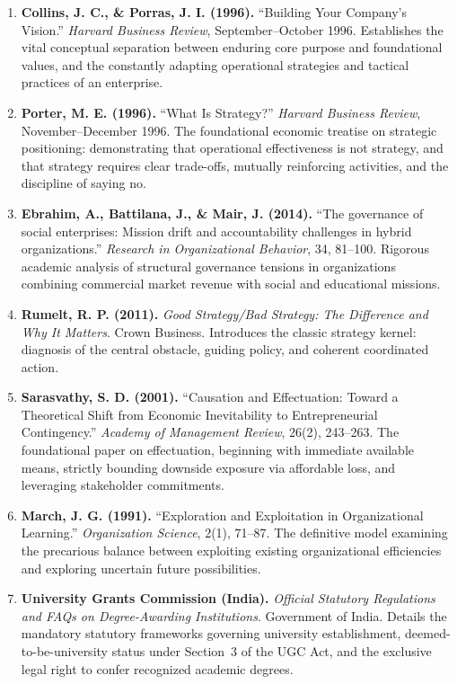 \begin{enumerate}[leftmargin=12pt,itemsep=3pt,topsep=1pt,parsep=0pt]
  \item \textbf{Collins, J. C., \& Porras, J. I. (1996).} ``Building Your Company's Vision.'' \textit{Harvard Business Review}, September--October 1996. Establishes the vital conceptual separation between enduring core purpose and foundational values, and the constantly adapting operational strategies and tactical practices of an enterprise.
  \item \textbf{Porter, M. E. (1996).} ``What Is Strategy?'' \textit{Harvard Business Review}, November--December 1996. The foundational economic treatise on strategic positioning: demonstrating that operational effectiveness is not strategy, and that strategy requires clear trade-offs, mutually reinforcing activities, and the discipline of saying no.
  \item \textbf{Ebrahim, A., Battilana, J., \& Mair, J. (2014).} ``The governance of social enterprises: Mission drift and accountability challenges in hybrid organizations.'' \textit{Research in Organizational Behavior}, 34, 81--100. Rigorous academic analysis of structural governance tensions in organizations combining commercial market revenue with social and educational missions.
  \item \textbf{Rumelt, R. P. (2011).} \textit{Good Strategy/Bad Strategy: The Difference and Why It Matters}. Crown Business. Introduces the classic strategy kernel: diagnosis of the central obstacle, guiding policy, and coherent coordinated action.
  \item \textbf{Sarasvathy, S. D. (2001).} ``Causation and Effectuation: Toward a Theoretical Shift from Economic Inevitability to Entrepreneurial Contingency.'' \textit{Academy of Management Review}, 26(2), 243--263. The foundational paper on effectuation, beginning with immediate available means, strictly bounding downside exposure via affordable loss, and leveraging stakeholder commitments.
  \item \textbf{March, J. G. (1991).} ``Exploration and Exploitation in Organizational Learning.'' \textit{Organization Science}, 2(1), 71--87. The definitive model examining the precarious balance between exploiting existing organizational efficiencies and exploring uncertain future possibilities.
  \item \textbf{University Grants Commission (India).} \textit{Official Statutory Regulations and FAQs on Degree-Awarding Institutions}. Government of India. Details the mandatory statutory frameworks governing university establishment, deemed-to-be-university status under Section~3 of the UGC Act, and the exclusive legal right to confer recognized academic degrees.

\end{enumerate}
